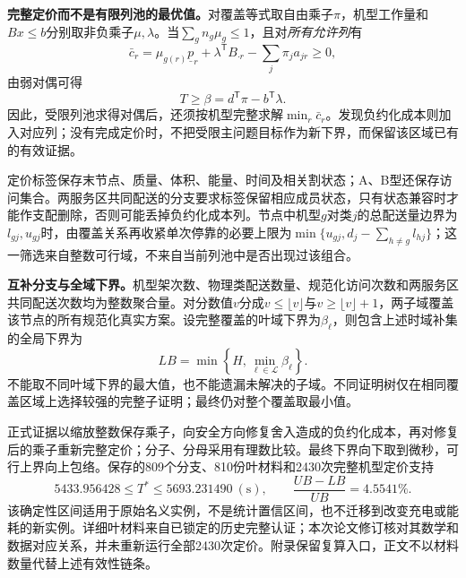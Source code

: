 \textbf{完整定价而不是有限列池的最优值。}对覆盖等式取自由乘子$\pi$，机型工作量和$Bx\le b$分别取非负乘子$\mu,\lambda$。当$\sum_gn_g\mu_g\le1$，且对\emph{所有允许列}有
\begin{equation}
 \bar c_r=\mu_{g(r)}\underline p_r+\lambda^{\mathsf T}B_{\cdot r}
            -\sum_j\pi_ja_{jr}\ge0,
 \label{eq:q2_pricing_rc}
\end{equation}
由弱对偶可得
\begin{equation}
 T\ge\beta=d^{\mathsf T}\pi-b^{\mathsf T}\lambda.
 \label{eq:q2_dual_bound}
\end{equation}
因此，受限列池求得对偶后，还须按机型完整求解$\min_r\bar c_r$。发现负约化成本则加入对应列；没有完成定价时，不把受限主问题目标作为新下界，而保留该区域已有的有效证据。

定价标签保存末节点、质量、体积、能量、时间及相关割状态；A、B型还保存访问集合。两服务区共同配送的分支要求标签保留相应成员状态，只有状态兼容时才能作支配删除，否则可能丢掉负约化成本列。节点中机型$g$对类$j$的总配送量边界为$l_{gj},u_{gj}$时，由覆盖关系再收紧单次停靠的必要上限为$\min\{u_{gj},d_j-\sum_{h\ne g}l_{hj}\}$；这一筛选来自整数可行域，不来自当前列池中是否出现过该组合。

\textbf{互补分支与全域下界。}机型架次数、物理类配送数量、规范化访问次数和两服务区共同配送次数均为整数聚合量。对分数值$v$分成$v\le\lfloor v\rfloor$与$v\ge\lfloor v\rfloor+1$，两子域覆盖该节点的所有规范化真实方案。设完整覆盖的叶域下界为$\beta_\ell$，则包含上述时域补集的全局下界为
\begin{equation}
 LB=\min\left\{H,\min_{\ell\in\mathcal L}\beta_\ell\right\}.
 \label{eq:q2_cover_bound}
\end{equation}
不能取不同叶域下界的最大值，也不能遗漏未解决的子域。不同证明树仅在相同覆盖区域上选择较强的完整子证明；最终仍对整个覆盖取最小值。

正式证据以缩放整数保存乘子，向安全方向修复舍入造成的负约化成本，再对修复后的乘子重新完整定价；分子、分母采用有理数比较。最终下界向下取到微秒，可行上界向上包络。保存的809个分支、810份叶材料和2430次完整机型定价支持
\begin{equation}
 5433.956428\le T^*\le5693.231490\ \mathrm{(s)},\qquad
 \frac{UB-LB}{UB}=4.5541\%.
 \label{eq:q2_bound}
\end{equation}
该确定性区间适用于原始名义实例，不是统计置信区间，也不迁移到改变充电或能耗的新实例。详细叶材料来自已锁定的历史完整认证；本次论文修订核对其数学和数据对应关系，并未重新运行全部2430次定价。附录保留复算入口，正文不以材料数量代替上述有效性链条。
